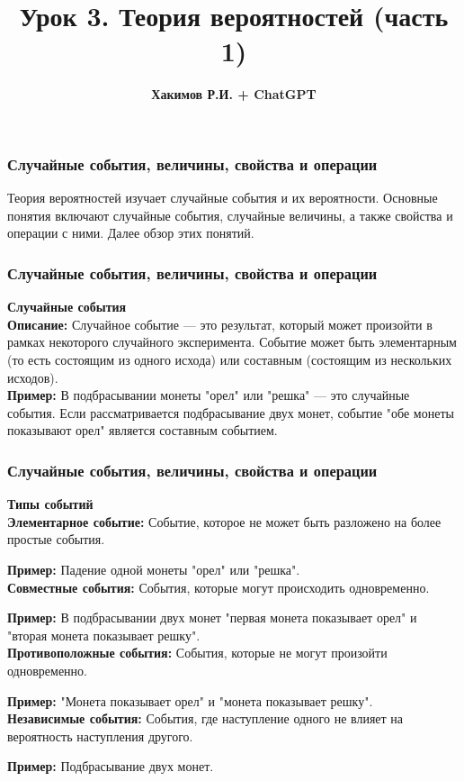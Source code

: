 \documentclass[aspectratio=169]{beamer}
\title{\bf Урок 3. Теория вероятностей (часть 1)}
\author{{\bf Хакимов Р.И. + ChatGPT}}
\date[\today]{}
\begin{document}
\begin{frame}
\titlepage
\end{frame}

\begin{frame}
\frametitle{Случайные события, величины, свойства и операции}
Теория вероятностей изучает случайные события и их вероятности. Основные понятия включают случайные события, случайные величины, а также свойства и операции с ними. Далее обзор этих понятий.
\end{frame}

\begin{frame}
\frametitle{Случайные события, величины, свойства и операции}
\textbf{Случайные события}
\newline\\
\textbf{Описание:} Случайное событие — это результат, который может произойти в рамках некоторого случайного эксперимента. Событие может быть элементарным (то есть состоящим из одного исхода) или составным (состоящим из нескольких исходов).
\newline\\
\textbf{Пример:} В подбрасывании монеты "орел" или "решка" — это случайные события. Если рассматривается подбрасывание двух монет, событие "обе монеты показывают орел" является составным событием.
\end{frame}

\begin{frame}
\frametitle{Случайные события, величины, свойства и операции}
\textbf{Типы событий}
\newline\\
\textbf{Элементарное событие:} Событие, которое не может быть разложено на более простые события.

\textbf{Пример:} Падение одной монеты "орел" или "решка".
\newline\\
\textbf{Совместные события:} События, которые могут происходить одновременно.

\textbf{Пример:} В подбрасывании двух монет "первая монета показывает орел" и "вторая монета показывает решку".
\newline\\
\textbf{Противоположные события:} События, которые не могут произойти одновременно.

\textbf{Пример:} "Монета показывает орел" и "монета показывает решку".
\newline\\
\textbf{Независимые события:} События, где наступление одного не влияет на вероятность наступления другого.

\textbf{Пример:} Подбрасывание двух монет.
\end{frame}
\end{document}
